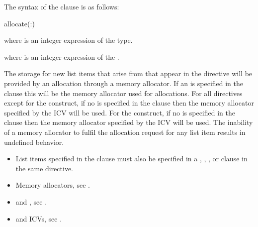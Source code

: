 \syntax

The syntax of the  clause is as follows:

\begin{boxedcode}
allocate(\plc{[allocator}:\plc{] list})
\end{boxedcode}

\begin{ccppspecific}
where  is an integer expression of the  type.
\end{ccppspecific}
\begin{fortranspecific}
where  is an integer expression of the  .
\end{fortranspecific}

\descr

The storage for new list items that arise from  that appear in the directive will be provided by an allocation through a memory allocator. If an  is specified in the clause this will be the memory allocator used for allocations. For all directives except for the  construct, if no  is specified in the clause then the memory allocator specified by the  ICV will be used. For the  construct, if no  is specified in the clause then the memory allocator specified by the  ICV will be used.  The inability of a memory allocator to fulfil the allocation request for any list item results in undefined behavior.

\restrictions
\begin{itemize}
\item List items specified in the  clause must also be specified in a , , ,  or
       clause in the same directive.
\end{itemize}

\crossreferences
\begin{itemize}
\item Memory allocators, see .
\item {} and , see .
\item {} and  ICVs, see .
\end{itemize}
